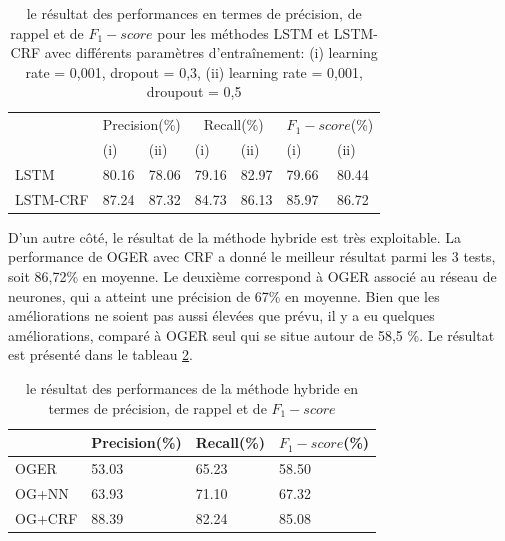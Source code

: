 \begin{center}
\begin{table}[h]
\begin{tabular}{ |p{2.5 cm}| p{1.5 cm}|p{1.5 cm}|p{1.5 cm}|p{1.5 cm}| p{1.5 cm}|p{1.5 cm}|} 
\hline
\multirow{2}{4em}{} & 
\multicolumn{2}{|c|}{Precision(\%)} 
& \multicolumn{2}{|c|}{Recall(\%)}
&\multicolumn{2}{|c|}{$F_{1}-score$(\%)} \\&
(i)&(ii)&(i)&(ii)&(i)&(ii) \\
\hline
LSTM & 80.16& 78.06& 79.16&82.97&79.66 &80.44 \\ 
\hline
LSTM-CRF &87.24&87.32&84.73&86.13&85.97&86.72 \\
\hline
\end{tabular}
\newline
\caption{\label{result1} le résultat des performances en termes de précision, de rappel et de $ F_ {1} -score $ pour les méthodes LSTM et LSTM-CRF avec différents paramètres d’entraînement: (i) learning rate = 0,001, dropout = 0,3, (ii) learning rate = 0,001, droupout = 0,5}
\end{table}
\end{center}

D'un autre côté, le résultat de la méthode hybride est très exploitable. La performance de OGER avec CRF a donné le meilleur résultat parmi les 3 tests, soit 86,72\% en moyenne. Le deuxième correspond à OGER associé au réseau de neurones, qui a atteint une précision de 67\% en moyenne. Bien que les améliorations ne soient pas aussi élevées que prévu, il y a eu quelques améliorations, comparé à OGER seul qui se situe autour de 58,5 \%. Le résultat est présenté dans le tableau \ref{resultat2}.

\begin{center}
\begin{table}[h]
\begin{tabular}{ |p{2.5cm}|p{3 cm}| p{3 cm}|p{3 cm}|} 
\hline
 &Precision(\%)&Recall(\%)&$F_{1}-score$(\%)\\
 \hline
OGER&53.03&65.23&58.50\\ 
\hline
OG+NN& 63.93&71.10 &67.32 \\
\hline
OG+CRF & 88.39&82.24&85.08\\
\hline
\end{tabular}
\newline
\caption{\label{resultat2} le résultat des performances de la méthode hybride en termes de précision, de rappel et de $F_{1}-score$}
\end{table}
\end{center}

